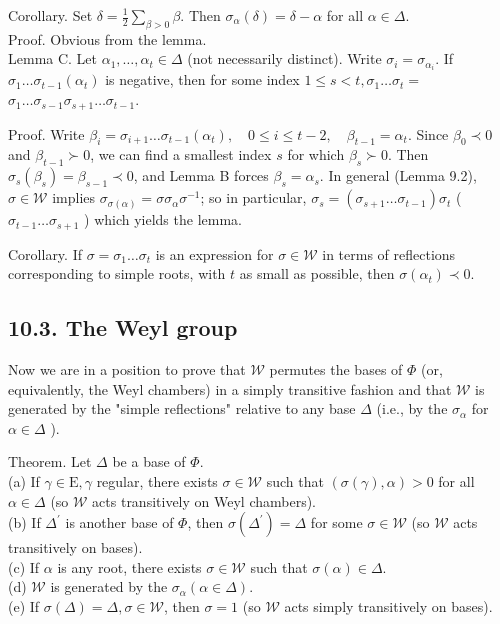 \documentclass[10pt]{article}
\begin{document}
Corollary. Set $\delta=\frac{1}{2} \sum_{\beta>0} \beta$. Then $\sigma_{\alpha}(\delta)=\delta-\alpha$ for all $\alpha \in \Delta$.\\
Proof. Obvious from the lemma.\\
Lemma C. Let $\alpha_{1}, \ldots, \alpha_{t} \in \Delta$ (not necessarily distinct). Write $\sigma_{i}=\sigma_{\alpha_{i}}$. If $\sigma_{1} \ldots \sigma_{t-1}\left(\alpha_{t}\right)$ is negative, then for some index $1 \leq s<t, \sigma_{1} \ldots \sigma_{t}=$ $\sigma_{1} \ldots \sigma_{s-1} \sigma_{s+1} \ldots \sigma_{t-1}$.

Proof. Write $\beta_{i}=\sigma_{i+1} \ldots \sigma_{t-1}\left(\alpha_{t}\right), \quad 0 \leq i \leq t-2, \quad \beta_{t-1}=\alpha_{t}$. Since $\beta_{0} \prec 0$ and $\beta_{t-1} \succ 0$, we can find a smallest index $s$ for which $\beta_{s} \succ 0$. Then $\sigma_{s}\left(\beta_{s}\right)=\beta_{s-1} \prec 0$, and Lemma B forces $\beta_{s}=\alpha_{s}$. In general (Lemma 9.2), $\sigma \in \mathscr{W}$ implies $\sigma_{\sigma(\alpha)}=\sigma \sigma_{\alpha} \sigma^{-1}$; so in particular, $\sigma_{s}=\left(\sigma_{s+1} \ldots \sigma_{t-1}\right) \sigma_{t}$ ( $\sigma_{t-1} \ldots \sigma_{s+1}$ ) which yields the lemma.

Corollary. If $\sigma=\sigma_{1} \ldots \sigma_{t}$ is an expression for $\sigma \in \mathscr{W}$ in terms of reflections corresponding to simple roots, with $t$ as small as possible, then $\sigma\left(\alpha_{t}\right) \prec 0$.

\subsection*{10.3. The Weyl group}
Now we are in a position to prove that $\mathscr{W}$ permutes the bases of $\Phi$ (or, equivalently, the Weyl chambers) in a simply transitive fashion and that $\mathscr{W}$ is generated by the "simple reflections" relative to any base $\Delta$ (i.e., by the $\sigma_{\alpha}$ for $\alpha \in \Delta$ ).

Theorem. Let $\Delta$ be a base of $\Phi$.\\
(a) If $\gamma \in \mathrm{E}, \gamma$ regular, there exists $\sigma \in \mathscr{W}$ such that $(\sigma(\gamma), \alpha)>0$ for all $\alpha \in \Delta$ (so $\mathscr{W}$ acts transitively on Weyl chambers).\\
(b) If $\Delta^{\prime}$ is another base of $\Phi$, then $\sigma\left(\Delta^{\prime}\right)=\Delta$ for some $\sigma \in \mathscr{W}$ (so $\mathscr{W}$ acts transitively on bases).\\
(c) If $\alpha$ is any root, there exists $\sigma \in \mathscr{W}$ such that $\sigma(\alpha) \in \Delta$.\\
(d) $\mathscr{W}$ is generated by the $\sigma_{\alpha}(\alpha \in \Delta)$.\\
(e) If $\sigma(\Delta)=\Delta, \sigma \in \mathscr{W}$, then $\sigma=1$ (so $\mathscr{W}$ acts simply transitively on bases).
\end{document}
